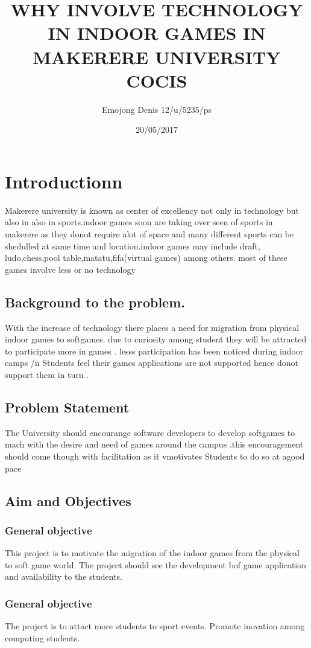 \documentclass{article}
\title{WHY  INVOLVE TECHNOLOGY IN INDOOR GAMES IN MAKERERE UNIVERSITY COCIS}
\author{ Emojong Denis 12/u/5235/ps}
\date{20/05/2017}
\begin{document}
  \maketitle
 
  
  \section{Introductionn}
Makerere university is known as center of excellency not only in technology  but also in also in sports.indoor games soon are taking over seen of sports in makerere as they donot require alot of space and many different sports can be shedulled at same time and location.indoor games may include draft, ludo,chess,pool table,matatu,fifa(virtual games) among others.
 most of these games involve less or no technology
      	\subsection{ Background to the problem.}
With the increase of technology there places a need for migration from physical indoor games to softgames. due to curiosity among student they will be attracted to participate more in games . lesss participation has been noticed during indoor camps
/n Students feel their games applications are not supported hence donot support them in turn .
	\subsection{ Problem Statement}
The University should encourange software developers to develop softgames to mach with the desire and need of games around the campus .this encouragement should come though with facilitation as it vmotivates Students to  do so at agood pace

	\subsection{Aim and Objectives}

	\subsubsection{  General objective}
This project is to motivate the migration of the indoor games from the physical to soft game world.
The project should see the development bof  game application and availability to the students.
\subsubsection{  General objective}
The project is to attact more students to sport events.
Promote inovation among computing students.
\end{document}
